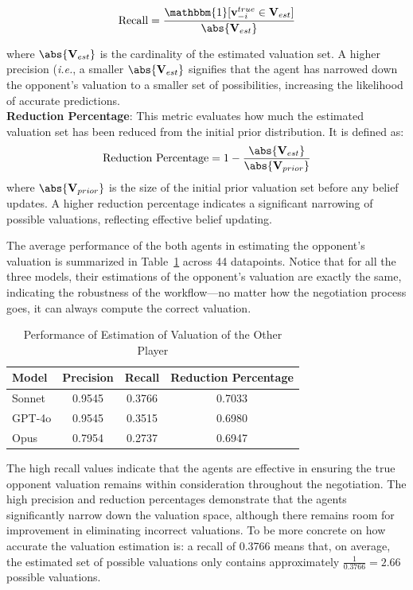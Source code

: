 $$\text{Recall} = \frac{\mathbbm{1}[\mathbf{v}_{-i}^{true}\in \mathbf{V}_{est}]}{\abs{\mathbf{V}_{est}}}$$

where $\abs{\mathbf{V}_{est}}$ is the cardinality of the estimated valuation set. A higher precision (\emph{i.e.}, a smaller $\abs{\mathbf{V}_{est}}$ signifies that the agent has narrowed down the opponent's valuation to a smaller set of possibilities, increasing the likelihood of accurate predictions.
\\
\textbf{Reduction Percentage}: This metric evaluates how much the estimated valuation set has been reduced from the initial prior distribution. It is defined as: $$\text{Reduction Percentage} = 1 - \frac{\abs{\mathbf{V}_{est}}}{\abs{\mathbf{V}_{prior}}}$$ where $\abs{\mathbf{V}_{prior}}$ is the size of the initial prior valuation set before any belief updates. A higher reduction percentage indicates a significant narrowing of possible valuations, reflecting effective belief updating.

The average performance of the both agents in estimating the opponent's valuation is summarized in Table~\ref{tab:accuracy} across 44 datapoints. Notice that for all the three models, their estimations of the opponent's valuation are exactly the same, indicating the robustness of the workflow---no matter how the negotiation process goes, it can always compute the correct valuation.

\begin{table}[!ht]
    \centering
    \setlength{\tabcolsep}{10pt}
    \begin{tabular}{l ccc}
    \toprule
        Model & Precision & Recall & Reduction Percentage \\
        \midrule
        Sonnet & 0.9545 & 0.3766 & 0.7033\\
        GPT-4o & 0.9545 & 0.3515 & 0.6980 \\
        Opus & 0.7954 & 0.2737 & 0.6947\\
        \bottomrule
    \end{tabular}
    \caption{Performance of Estimation of Valuation of the Other Player}
    \label{tab:accuracy}
\end{table}

The high recall values indicate that the agents are effective in ensuring the true opponent valuation remains within consideration throughout the negotiation. The high precision and reduction percentages demonstrate that the agents significantly narrow down the valuation space, although there remains room for improvement in eliminating incorrect valuations. To be more concrete on how accurate the valuation estimation is: a recall of 0.3766 means that, on average, the estimated set of possible valuations only contains approximately $\frac{1}{0.3766} = 2.66$ possible valuations.


